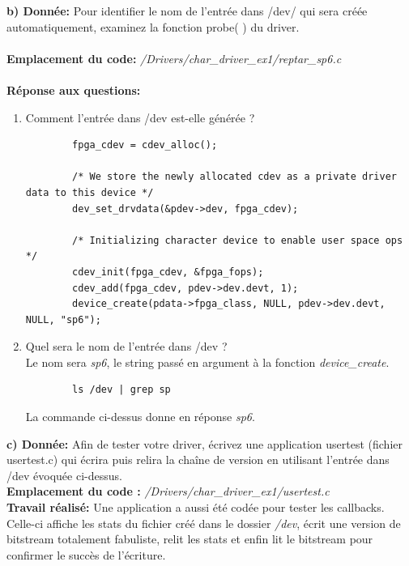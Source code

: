 \textbf{b) Donnée: }Pour identifier le nom de l'entrée dans /dev/ qui sera créée automatiquement, examinez la fonction
probe( ) du driver.\\\\
\textbf{Emplacement du code: }\textit{/Drivers/char\_driver\_ex1/reptar\_sp6.c}\\\\
\textbf{Réponse aux questions: }
\begin{enumerate}
	\item Comment l'entrée dans /dev est-elle générée ? 
	\begin{lstlisting}
		fpga_cdev = cdev_alloc();
		
		/* We store the newly allocated cdev as a private driver data to this device */
		dev_set_drvdata(&pdev->dev, fpga_cdev);
		
		/* Initializing character device to enable user space ops */
		cdev_init(fpga_cdev, &fpga_fops);
		cdev_add(fpga_cdev, pdev->dev.devt, 1);
		device_create(pdata->fpga_class, NULL, pdev->dev.devt, NULL, "sp6");
	\end{lstlisting}
	\item  Quel sera le nom de l'entrée dans /dev ? \\
	Le nom sera \textit{sp6}, le string passé en argument à la fonction \textit{device\_create}.
	\begin{lstlisting}
		ls /dev | grep sp 
	\end{lstlisting}
	La commande ci-dessus donne en réponse \textit{sp6}.
\end{enumerate}
\textbf{c) Donnée: }Afin de tester votre driver, écrivez une application usertest (fichier usertest.c) qui écrira puis relira
la chaîne de version en utilisant l’entrée dans /dev évoquée ci-dessus.\\

\textbf{Emplacement du code : }\textit{/Drivers/char\_driver\_ex1/usertest.c}\\

\textbf{Travail réalisé: }Une application a aussi été codée pour tester les callbacks. Celle-ci affiche les stats du fichier créé dans le dossier \textit{/dev}, écrit une version de bitstream totalement fabuliste, relit les stats et enfin lit le bitstream pour confirmer le succès de l'écriture.\\

